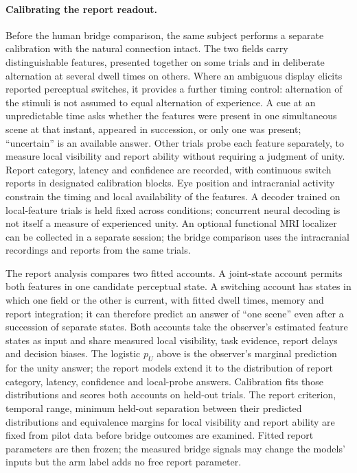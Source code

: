 \documentclass[12pt]{article}
\begin{document}
\paragraph{Calibrating the report readout.} Before the human bridge comparison,
the same subject performs a separate calibration with the natural connection
intact. The two fields carry distinguishable features, presented together on
some trials and in deliberate alternation at several dwell times on others.
Where an ambiguous display elicits reported perceptual switches, it provides a
further timing control: alternation of the stimuli is not assumed to equal
alternation of experience. A cue at an unpredictable time asks whether the
features were present in one simultaneous scene at that instant, appeared in
succession, or only one was present; ``uncertain'' is an available answer.
Other trials probe each feature separately, to measure local visibility and
report ability without requiring a judgment of unity. Report category, latency
and confidence are recorded, with continuous switch reports in designated
calibration blocks. Eye position and intracranial activity constrain the timing
and local availability of the features. A decoder trained on local-feature
trials is held fixed across conditions; concurrent neural decoding is not
itself a measure of experienced unity. An optional functional MRI localizer can
be collected in a separate session; the bridge comparison uses the intracranial
recordings and reports from the same trials.

The report analysis compares two fitted accounts. A joint-state account permits
both features in one candidate perceptual state. A switching account has states
in which one field or the other is current, with fitted dwell times, memory and
report integration; it can therefore predict an answer of ``one scene'' even
after a succession of separate states. Both accounts take the observer's
estimated feature states as input and share measured local visibility, task
evidence, report delays and decision biases. The logistic $p_U$ above is the
observer's marginal prediction for the unity answer; the report models extend
it to the distribution of report category, latency, confidence and local-probe
answers. Calibration fits those distributions and scores both accounts on
held-out trials. The report criterion, temporal range, minimum held-out
separation between their predicted distributions and equivalence margins for
local visibility and report ability are fixed from pilot data before bridge
outcomes are examined. Fitted report parameters are then frozen; the measured
bridge signals may change the models' inputs but the arm label adds no free
report parameter.
\end{document}
